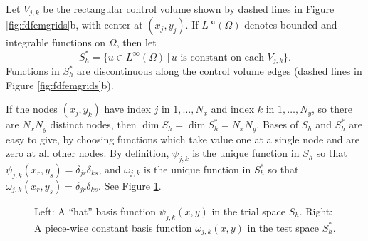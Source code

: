 \documentclass[11pt]{amsart}
\begin{document}
Let $V_{j,k}$ be the rectangular control volume shown by dashed lines in Figure \ref{fig:fdfemgrids}b, with center at $(x_j,y_j)$.  If $L^\infty(\Omega)$ denotes bounded and integrable functions on $\Omega$, then let
\begin{equation}
S_h^* = \{u \in L^\infty(\Omega) \,\big|\, u \text{ is constant on each $V_{j,k}$}\}.
\end{equation}
Functions in $S_h^*$ are discontinuous along the control volume edges (dashed lines in Figure \ref{fig:fdfemgrids}b).

If the nodes $(x_j,y_k)$ have index $j$ in $1,\dots,N_x$ and index $k$ in $1,\dots,N_y$, so there are $N_xN_y$ distinct nodes, then $\dim S_h = \dim S_h^* = N_x N_y$.  Bases of $S_h$ and $S_h^*$ are easy to give, by choosing functions which take value one at a single node and are zero at all other nodes.  By definition, $\psi_{j,k}$ is the unique function in $S_h$ so that $\psi_{j,k}(x_r,y_s) = \delta_{jr} \delta_{ks}$, and $\omega_{j,k}$ is the unique function in $S_h^*$  so that $\omega_{j,k}(x_r,y_s) = \delta_{jr} \delta_{ks}$.  See Figure \ref{fig:fembases}.

\begin{figure}[ht]
\begin{center}
 \quad 
\end{center}
\caption{Left: A ``hat'' basis function $\psi_{j,k}(x,y)$ in the trial space $S_h$.  Right: A piece-wise constant basis function $\omega_{j,k}(x,y)$ in the test space $S_h^*$.}
\label{fig:fembases}
\end{figure}
\end{document}
